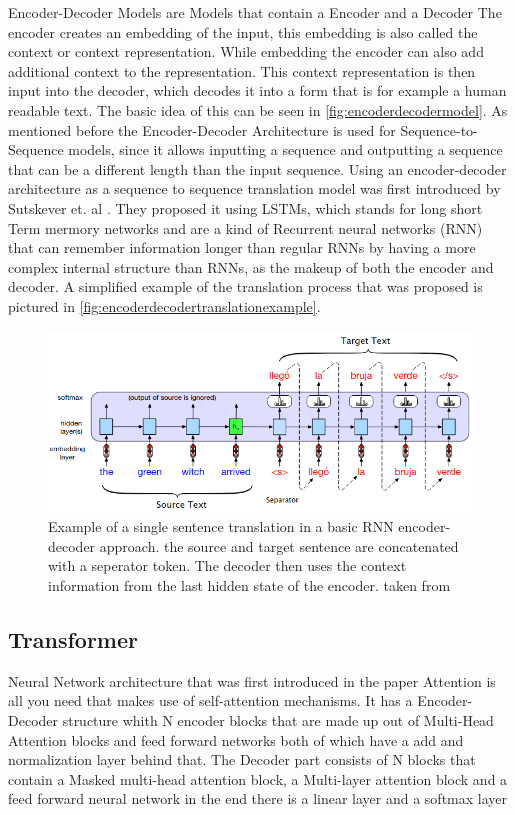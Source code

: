 Encoder-Decoder Models are Models that contain a Encoder and a Decoder
The encoder creates an embedding of the input, this embedding is also called the context or context representation. While embedding the encoder can also add additional context to the representation. 
This context representation is then input into the decoder, which decodes it into a form that is for example a human readable text. 
The basic idea of this can be seen in \autoref{fig:encoderdecodermodel}.
As mentioned before the Encoder-Decoder Architecture is used for Sequence-to-Sequence models, since it allows inputting a sequence and outputting a sequence that can be a different length than the input sequence. \cite[chapter~8.7]{jm3}
Using an encoder-decoder architecture as a sequence to sequence translation model was first introduced by Sutskever et. al \cite{sutskever2014sequencesequencelearningneural}.
They proposed it using LSTMs, which stands for long short Term mermory networks and are a kind of Recurrent neural networks (RNN) that can remember information longer than regular RNNs by having a more complex internal structure than RNNs, as the makeup of both the encoder and decoder. 
A simplified example of the translation process that was proposed is pictured in \autoref{fig:encoderdecodertranslationexample}.
\begin{figure}
    \centering
    \includegraphics[width=0.5\linewidth]{Latex//sections//images/encoderdecodertranslation.png}
    \caption{Example of a single sentence translation in a basic RNN encoder-decoder approach. the source and target sentence are concatenated with a seperator token. The decoder then uses the context information from the last hidden state of the encoder. taken from \cite{jm3}} 
    \label{fig:encoderdecodertranslationexample}
\end{figure}


\subsection{Transformer}
Neural Network architecture that was first introduced in the paper Attention is all you need \cite{vaswani2023attentionneed} that makes use of self-attention mechanisms. 
It has a Encoder-Decoder structure whith N encoder blocks that are made up out of Multi-Head Attention blocks and feed forward networks both of which have a add and normalization layer behind that. 
The Decoder part consists of N blocks that contain a Masked multi-head attention block, a Multi-layer attention block and a feed forward neural network 
in the end there is a linear layer and a softmax layer

